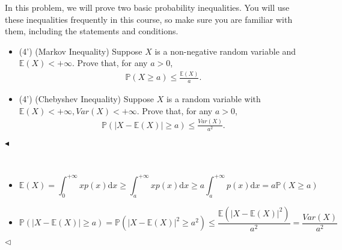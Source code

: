 \documentclass[11pt]{article}
\newenvironment{problem}[2][Problem]{\begin{trivlist}
\item[\hskip \labelsep {\bfseries #1}\hskip \labelsep {\bfseries #2.}]}{\hfill$\blacktriangleleft$\end{trivlist}}
\newenvironment{answer}[1][Answer]{\begin{trivlist}
\item[\hskip \labelsep {\bfseries #1.}\hskip \labelsep]}{\hfill$\lhd$\end{trivlist}}
\begin{document}
\begin{problem}{3 (8')} In this problem, we will prove two basic probability inequalities. You will use these inequalities frequently in this course, so make sure you are familiar with them, including the statements and conditions.
\begin{itemize}
    \item [(1)] (4') (Markov Inequality) Suppose $X$ is a non-negative random variable and $\mathbb{E}(X)<+\infty$. Prove that, for any $a>0$,
    \begin{align*}
        \mathbb{P}(X\geq a)\leq\frac{\mathbb{E}(X)}{a}.
    \end{align*}
    \item [(2)] (4') (Chebyshev Inequality) Suppose $X$ is a random variable with $\mathbb{E}(X)<+\infty, Var(X)<+\infty$. Prove that, for any $a>0$,
    \begin{align*}
        \mathbb{P}(|X-\mathbb{E}(X)|\geq a)\leq\frac{Var(X)}{a^2}.
    \end{align*}
\end{itemize}
\end{problem}

\begin{answer} ~
\begin{itemize}
    \item [(1)] 
$$\mathbb E(X)=\int_0^{+\infty} xp(x)\mathrm dx\ge \int_a^{+\infty} xp(x)\mathrm dx\ge a\int_a^{+\infty} p(x)\mathrm dx=a\mathbb P(X\ge a)$$
    \item [(2)] 
$$\mathbb P(|X-\mathbb E(X)|\ge a)=\mathbb P(|X-\mathbb E(X)|^2\ge a^2)\leq \frac{\mathbb E(|X-\mathbb E(X)|^2)}{a^2}=\frac{Var(X)}{a^2}$$
\end{itemize}
\end{answer}
\end{document}
